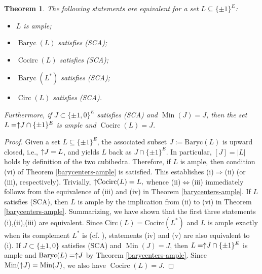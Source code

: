 \documentclass[11pt,a4paper]{amsart}
\newtheorem{theorem}{Theorem}
\theoremstyle{definition}
\numberwithin{equation}{section}
\DeclareMathOperator{\Baryc}{Baryc}
\DeclareMathOperator{\Cocirc}{Cocirc}
\DeclareMathOperator{\Circ}{Circ}
\DeclareMathOperator{\Min}{Min}
\newcommand{\covectors}{\ensuremath{L}}
\newcommand{\hcovectors}{J}
\begin{document}
\begin{theorem} \label{cocircuit} The following statements are equivalent for a set $\covectors\subseteq \{ \pm 1\}^E$:
\begin{itemize}
\item[\rm(i)] ${\covectors}$ is ample;
\item[\rm(ii)] $\Baryc({\covectors})$ satisfies (SCA);
\item[\rm(iii)] $\Cocirc({\covectors})$ satisfies (SCA);
\item[\rm(iv)] $\Baryc({\covectors}^*)$ satisfies (SCA);
\item[\rm(v)] $\Circ({\covectors})$ satisfies (SCA).
\end{itemize}
Furthermore, if $\hcovectors\subset \{ \pm 1,0\}^E$ satisfies (SCA) and $\Min(\hcovectors)=\hcovectors$, then the set $\covectors=\uparrow\hspace*{-0.1cm}\hcovectors\cap \{ \pm 1\}^E$ is ample and $\Cocirc(\covectors)=\hcovectors$.
\end{theorem}

\begin{proof} Given a set $\covectors\subseteq \{ \pm 1\}^E$, the associated subset $\hcovectors:=\mbox{Baryc}(\covectors)$ is upward closed, i.e.,
$\uparrow\hspace*{-0.1cm}\hcovectors=\covectors$, and yields $\covectors$ back as $\hcovectors\cap \{ \pm 1\}^E$. In particular, $[\hcovectors]=|\covectors|$ holds by definition of the two cubihedra.
Therefore, if $\covectors$ is ample, then condition (vi) of Theorem \ref{barycenters-ample} is satisfied. This establishes (i)$\Rightarrow$(ii) (or (iii), respectively).
Trivially, $\uparrow\hspace*{-0.1cm}\mbox{Cocirc}(\covectors)=\covectors,$ whence (ii)$\Longleftrightarrow$(iii) immediately follows from the equivalence of (iii) and (iv) in Theorem \ref{barycenters-ample}. If $\covectors$ satisfies (SCA), then $\covectors$ is ample by the implication from (ii) to (vi) in Theorem \ref{barycenters-ample}. Summarizing, we have shown that the first three statements
(i),(ii),(iii) are equivalent. Since $\mbox{Circ}(\covectors)=\mbox{Cocirc}(\covectors^*)$ and $\covectors$ is ample exactly when its complement $\covectors^*$ is
(cf. \cite[Theorem 2]{BaChDrKo}), statements (iv) and (v) are also equivalent to (i).  If $\hcovectors\subset \{ \pm 1,0\}$ satisfies (SCA) and $\Min(\hcovectors)=\hcovectors$, then $\covectors=\uparrow\hspace*{-0.1cm}\hcovectors\cap \{ \pm 1\}^E$ is ample and $\Baryc(\covectors)=\uparrow\hspace*{-0.1cm}\hcovectors$ by Theorem  \ref{barycenters-ample}. Since $\Min(\uparrow\hspace*{-0.1cm}\hcovectors)=\Min(\hcovectors)$, we also have $\Cocirc(\covectors)=\hcovectors$.
\end{proof}
\end{document}

